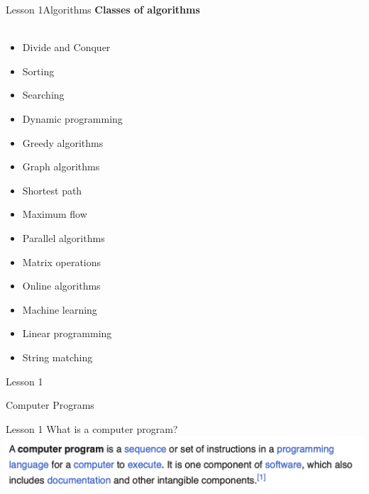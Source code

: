 \documentclass[aspectratio=1610]{beamer}
\begin{document}
\begin{frame}{Lesson 1}{Algorithms}
\Large
\textbf{Classes of algorithms}\\~\\ 
    \begin{multicols}{3}
    \begin{itemize}
        \item Divide and Conquer
        \item Sorting
        \item Searching
        \item Dynamic programming
        \item Greedy algorithms
        \item Graph algorithms
        \item Shortest path
        \item Maximum flow
        \item Parallel algorithms
        \item Matrix operations
        \item Online algorithms
        \item Machine learning
        \item Linear programming
        \item String matching
    \end{itemize}
    \end{multicols}
\end{frame}



\begin{frame}{Lesson 1}{}
\begin{center}
\Huge Computer Programs
\end{center}
\end{frame}


\begin{frame}{Lesson 1}{}
{\Huge{What is a computer program?}}
\includegraphics[scale=0.67]{Images/program}
\end{frame}
\end{document}
